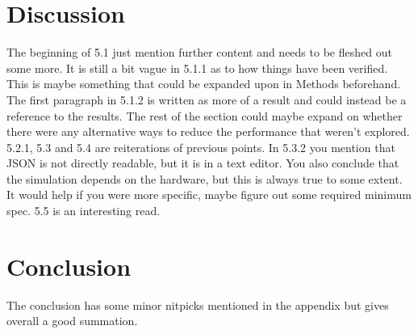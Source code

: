 \documentclass[12pt,a4paper,twoside,openright]{report}
\begin{document}
\section*{Discussion}

	The beginning of 5.1 just mention further content and needs to be fleshed out
	some more. It is still a bit vague in 5.1.1 as to how things have been
	verified. This is maybe something that could be expanded upon in Methods
	beforehand. The first paragraph in 5.1.2 is written as more of a result and
	could instead be a reference to the results. The rest of the section could
	maybe expand on whether there were any alternative ways to reduce the
	performance that weren't explored. 5.2.1, 5.3 and 5.4 are reiterations of
	previous points. In 5.3.2 you mention that JSON is not directly readable, but
	it is in a text editor. You also conclude that the simulation depends on the
	hardware, but this is always true to some extent. It would help if you were
	more specific, maybe figure out some required minimum spec. 5.5 is an
	interesting read.

\section*{Conclusion}

	The conclusion has some minor nitpicks mentioned in the appendix but gives
	overall a good summation.
\end{document}
